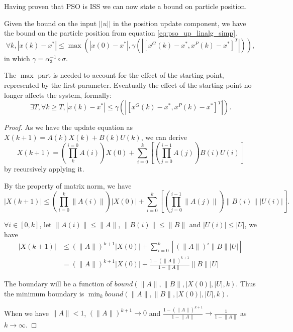 Having proven that PSO is ISS we can now state a bound on particle position.

\begin{mythm}
\label{coro:state_bound}
Given the bound on the input $ || u || $ in the position update component, we have the bound on the particle position from equation \eqref{eq:pso_up_linalg_simp}.
\begin{equation}
\label{eq:state_bound}
\forall k, 
| x(k) - x^{*} | \leq \max ( | x(0) - x^{*} | , \gamma ( | [ x^{G}(k) - x^{*}, x^{P}(k) - x^{*} ]^{T} | ) ),
\end{equation}
in which $ \gamma = \alpha_{3}^{-1} \circ \sigma $.

The $ \max $ part is needed to account for the effect of the starting point, represented by the first parameter. Eventually the effect of the starting point no longer affects the system, formally:
\begin{equation}
\label{eq:state_bound:conv}
\exists T, \forall k \geq T, 
|  x(k) - x^{*} | \leq \gamma ( | [ x^{G}(k) - x^{*}, x^{P}(k) - x^{*} ]^{T} | ).
\end{equation}
\begin{proof}
As we have the update equation as
$ X(k+1) = A(k) X(k) + B(k) U(k) $, we can derive 
\begin{equation}
X(k+1) = ( \prod_{k}^{i=0} A(i) ) X(0) + \sum_{i=0}^{k} [ ( \prod_{j=0}^{i-1} A(j) ) B(i) U(i)  ] 
\end{equation}
by recursively applying it.

By the property of matrix norm, we have
\begin{equation}
| X(k+1) | \leq ( \prod_{i=0}^{k} \lVert A(i) \rVert ) | X(0) | + \sum_{i=0}^{k} [ ( \prod_{j=0}^{i-1} \lVert A(j) \rVert ) \lVert B(i) \rVert | U(i) |  ].
\end{equation}

$ \forall i \in [0, k] $, let $ \lVert A(i) \rVert \leq \lVert A \rVert $, $  \lVert B(i) \rVert \leq \lVert B \rVert $ and $ | U(i) | \leq | U | $, we have
\begin{equation}
\begin{aligned}
| X(k+1) | & \leq ( \lVert A \rVert )^{k+1} | X(0) | + \sum_{i=0}^{k} [ ( \lVert A \rVert )^{i} \lVert B \rVert | U |  ] \\
& = ( \lVert A \rVert )^{k+1} | X(0) | + \frac{1 - ( \lVert A \rVert )^{k+1} }{1 - \lVert A \rVert }  \lVert B \rVert | U |
\end{aligned}
\end{equation}

The boundary will be a function of $ bound ( \lVert A \rVert, \lVert B \rVert, | X(0) |, | U |, k ) $.
Thus the minimum boundary is $ \min_{k} bound ( \lVert A \rVert, \lVert B \rVert, | X(0) |, | U |, k ) $.

When we have $ \lVert A \rVert < 1 $, 
$ ( \lVert A \rVert )^{k+1} \rightarrow 0 $ and
$ \frac{1 - (\lVert A \rVert )^{k+1} }{1 - \lVert A \rVert} \rightarrow \frac{1}{1 - \lVert A \rVert } $
as $ k \rightarrow \infty $.
\end{proof}
\end{mythm}

